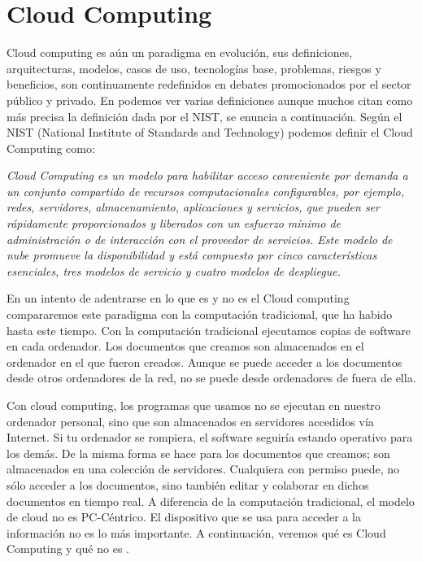 \documentclass[runningheads]{llncs}
\begin{document}
\section{Cloud Computing}

Cloud computing es aún un paradigma en evolución, sus definiciones, arquitecturas, modelos, casos de uso, tecnologías base, problemas, 
riesgos y beneficios, son continuamente redefinidos en debates promocionados por el sector público y privado. En\cite{Bible2011} 
podemos ver varias  definiciones aunque muchos citan como más precisa la definición dada por el NIST, se enuncia a continuación.
Según el NIST (National Institute of Standards and Technology) podemos definir el Cloud Computing como: 

\textit{Cloud Computing es un modelo para habilitar acceso conveniente por demanda a un conjunto compartido de recursos computacionales 
configurables, por ejemplo, redes, servidores, almacenamiento, aplicaciones y servicios, que pueden ser rápidamente proporcionados y 
liberados con un esfuerzo mínimo de administración o de interacción con el proveedor de servicios. Este modelo de nube promueve la 
disponibilidad y está compuesto por cinco características esenciales, tres modelos de servicio y cuatro modelos de despliegue. }



En un intento de adentrarse en lo que es y no es el Cloud computing compararemos este paradigma con la computación tradicional, 
que ha habido hasta este tiempo. Con la computación tradicional ejecutamos copias de software en cada ordenador. 
Los documentos que creamos  son almacenados en el ordenador en el que fueron creados. Aunque se puede acceder a los documentos desde 
otros ordenadores de la red, no se puede desde ordenadores de fuera de ella. 

Con cloud computing, los programas que usamos no se ejecutan en nuestro ordenador personal, sino que son almacenados en servidores 
accedidos vía Internet. Si tu ordenador se rompiera, el software seguiría estando operativo para los demás. De la misma forma se hace 
para los documentos que creamos; son almacenados en una colección de servidores. Cualquiera con permiso puede, no sólo acceder a los 
documentos, sino también editar y colaborar en dichos documentos en tiempo real. A diferencia de la computación tradicional, el modelo 
de cloud no es PC-Céntrico. El dispositivo que se usa para acceder a la información no es lo más importante. A continuación, veremos 
qué es Cloud Computing y qué no es \cite{Web08} .
\end{document}
